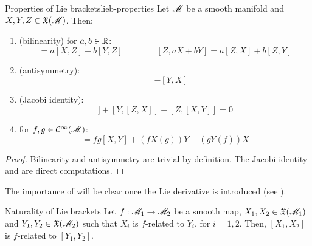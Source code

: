 \begin{lemma}{Properties of Lie brackets}{lieb-properties}
  Let $ \mathscr{M} $ be a smooth manifold and $ X,Y,Z \in \mathfrak{X}(\mathscr{M}) $. Then:
  \begin{enumerate}
    \item \label{item:lieb-1} (bilinearity) for $ a,b \in \mathbb{R} $:
      \begin{equation*}
        [aX + bY , Z] = a [X,Z] + b [Y,Z]
        \qquad \qquad
        [Z , aX + bY] = a [Z,X] + b [Z,Y]
      \end{equation*}
    \item \label{item:lieb-2} (antisymmetry):
      \begin{equation*}
        [X,Y] = - [Y,X]
      \end{equation*}
    \item \label{item:lieb-3} (Jacobi identity):
      \begin{equation}
        [X,[Y,Z]] + [Y,[Z,X]] + [Z,[X,Y]] = 0
      \end{equation}
    \item \label{item:lieb-4} for $ f,g \in \mathcal{C}^{\infty}(\mathscr{M}) $:
      \begin{equation}
        [fX , gY] = fg [X,Y] + (f X(g)) Y - (g Y(f)) X
        \label{eq:lied-aux}
      \end{equation}
  \end{enumerate}
\end{lemma}

\begin{proofbox}
  \begin{proof}
    Bilinearity and antisymmetry are trivial by definition. The Jacobi identity and  are direct computations.
  \end{proof}
\end{proofbox}

The importance of  will be clear once the Lie derivative is introduced (see ).

\begin{proposition}{Naturality of Lie brackets}{}
  Let $ f : \mathscr{M}_1 \rightarrow \mathscr{M}_2 $ be a smooth map, $ X_1 , X_2 \in \mathfrak{X}(\mathscr{M}_1) $ and $ Y_1 , Y_2 \in \mathfrak{X}(\mathscr{M}_2) $ such that $ X_i $ is $ f $-related to $ Y_i $, for $ i = 1,2 $. Then, $ [X_1 , X_2] $ is $ f $-related to $ [Y_1 , Y_2] $.
\end{proposition}

